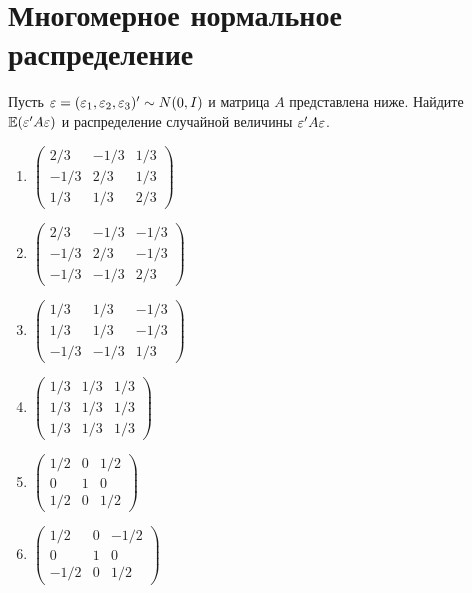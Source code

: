 \documentclass[pdftex,11pt,openany]{book}\usepackage[]{graphicx}\usepackage[]{color}
\begin{document}
\begin{solution}
\end{solution}



\chapter{Многомерное нормальное распределение} %

\begin{problem}
Пусть $\varepsilon = (\varepsilon_1, \varepsilon_2, \varepsilon_3)'\sim N (0,I)$ и матрица $A$ представлена ниже. Найдите $\mathbb{E}(\varepsilon'A\varepsilon)$ и распределение случайной величины $\varepsilon'A\varepsilon$.

\begin{enumerate}
\item 
$\begin{pmatrix} 2/3 & -1/3 & 1/3 \\ -1/3 & 2/3 & 1/3 \\ 1/3 & 1/3 & 2/3 \end{pmatrix}$


\item 
$\begin{pmatrix} 2/3 & -1/3 & -1/3 \\ -1/3 & 2/3 & -1/3 \\ -1/3 & -1/3 & 2/3 \end{pmatrix}$


\item 
$\begin{pmatrix} 1/3 & 1/3 & -1/3 \\ 1/3 & 1/3 & -1/3 \\ -1/3 & -1/3 & 1/3 \end{pmatrix}$


\item
$\begin{pmatrix} 1/3 & 1/3 & 1/3 \\ 1/3 & 1/3 & 1/3 \\ 1/3 & 1/3 & 1/3 \end{pmatrix}$


\item
$\begin{pmatrix} 1/2 & 0 & 1/2 \\ 0 & 1 & 0 \\ 1/2 & 0 & 1/2 \end{pmatrix}$


\item
$\begin{pmatrix} 1/2 & 0 & -1/2 \\ 0 & 1 & 0 \\ -1/2 & 0 & 1/2 \end{pmatrix}$



\end{enumerate}
\end{problem}
\end{document}

